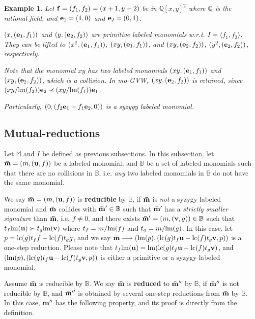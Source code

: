 \documentclass[final, number, 3p,12pt]{elsarticle}
\newtheorem{example}[theorem]{Example}
\def\Q{{\mathbb{Q}}}
\def\B{{\mathbb{B}}}
\def\M{{\mathbb M}}
\def\brm{{\bf \bar{m}}}
\def\lm{{\rm lm}} %
\def\lc{{\rm lc}}
\def\f{{\bf f}}
\def\e{{\bf e}}
\def\u{{\bf u}}
\def\v{{\bf v}}
\begin{document}
\begin{example}
Let $\f = (f_1, f_2) = (x + 1, y+2)$ be in $\Q[x, y]^2$ where $\Q$ is the rational field, and $\e_1 = (1, 0)$ and $ \e_2 = (0, 1)$. 

$(x, (\e_1, f_1))$ and $(y, (\e_2, f_2))$ are primitive labeled monomials w.r.t. $I = \langle f_1, f_2\rangle$. They can be lifted to $(x^2, (\e_1, f_1))$, $(xy, (\e_1, f_1))$, and $(xy, (\e_2, f_2))$, $(y^2, (\e_2, f_2))$, respectively. 

Note that the monomial $xy$ has two labeled monomials  $(xy, (\e_1, f_1))$ and $(xy, (\e_2, f_2))$, which is a collision. In mo-GVW, $(xy, (\e_2, f_2))$ is retained, since $(xy/\lm(f_2))\e_2 \prec (xy/\lm(f_1))\e_1$. 

Particularly, $(0,  (f_2\e_1 - f_1\e_2, 0))$ is a syzygy labeled monomial.

\end{example}




\subsection{Mutual-reductions} \label{subsec_reduction}


Let $\M$ and $I$ be defined as previous subsections. In this subsection, let $\brm = (m, (\u, f))$ be a labeled monomial, and $\B$ be a set of labeled monomials such that there are no collisions in $\B$, i.e. {\em any} two labeled monomials in $\B$ do not have the same monomial.

We say $\brm = (m, (\u, f))$ is {\bf reducible} by $\B$, if $\brm$ is {\em not} a syzygy labeled monomial and $\brm$ collides with $\brm' \in \B$ such that $\brm'$ has a {\em strictly smaller signature} than $\brm$, i.e. $f\not=0$, and there exists $\brm' = (m, (\v, g)) \in \B$ such that $t_f\lm(\u) \succ t_g\lm(\v)$ where $t_f = m/\lm(f)$ and $t_g =m/\lm(g)$. In this case, let $p = \lc(g)t_f f - \lc(f)t_g g$, and we say $\brm \longrightarrow (\lm(p), (\lc(g)t_f \u - \lc(f)t_g \v, p))$ is a one-step reduction. Please note that $t_f\lm(\u) = \lm(\lc(g)t_f \u - \lc(f)t_g \v)$, and $(\lm(p), (\lc(g)t_f \u - \lc(f)t_g \v, p))$ is either a primitive or a syzygy labeled monomial.

Assume $\brm$ is reducible by $\B$. We say $\brm$ is {\bf reduced} to $\brm''$ by $\B$, if $\brm''$ is not reducible by $\B$, and $\brm''$ is obtained by several one-step reductions from $\brm$ by $\B$. In this case, $\brm''$ has the following property, and its proof is directly from the definition.
\end{document}
